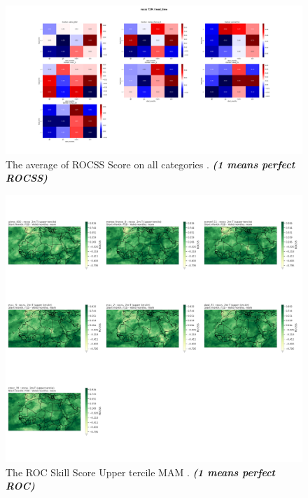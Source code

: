 \begin{figure}[H]
    \centering
    \includegraphics[scale=0.25]{rocss_T2M_lead_time.png}
    \caption{The average of  ROCSS Score on all categories    . \textbf{\textit{(1 means perfect ROCSS)}}}
\end{figure}


\begin{figure}[H]
    \centering
    \includegraphics[scale=0.3]{ROCSS_MAM_UPPER.png}
    \caption{The ROC Skill Score Upper tercile MAM    . \textbf{\textit{(1 means perfect ROC)}}}
\end{figure}








